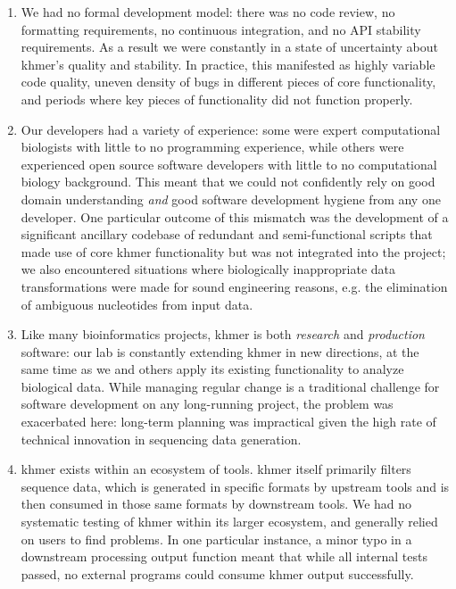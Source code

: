 \documentclass[12pt]{article}
\begin{document}
\begin{enumerate}

\item We had no formal development model: there was no code review, no
  formatting requirements, no continuous integration, and no API
  stability requirements.  As a result we were constantly in a
  state of uncertainty about khmer's quality and stability.  In practice,
  this manifested as highly variable code quality, uneven density of
  bugs in different pieces of core functionality, and periods where
  key pieces of functionality did not function properly.

\item Our developers had a variety of experience: some were expert
  computational biologists with little to no programming experience,
  while others were experienced open source software developers with
  little to no computational biology background.  This meant that we
  could not confidently rely on good domain understanding {\em and}
  good software development hygiene from any one developer.  One
  particular outcome of this mismatch was the development of a
  significant ancillary codebase of redundant and semi-functional
  scripts that made use of core khmer functionality but was not
  integrated into the project; we also encountered situations where
  biologically inappropriate data transformations were made for sound
  engineering reasons, e.g. the elimination of ambiguous nucleotides
  from input data.

\item Like many bioinformatics projects, khmer is both {\em
  research} and {\em production} software: our lab is constantly
  extending khmer in new directions, at the same time as we and others
  apply its existing functionality to analyze biological data.
  While managing regular change is a traditional challenge
  for software development on any long-running project, the problem was
  exacerbated here: long-term planning was impractical given
  the high rate of technical innovation in sequencing data generation.

\item khmer exists within an ecosystem of tools. khmer itself
  primarily filters sequence data, which is generated in specific
  formats by upstream tools and is then consumed in those same formats
  by downstream tools.  We had no systematic testing of khmer within
  its larger ecosystem, and generally relied on users to find
  problems.  In one particular instance, a minor typo in a downstream
  processing output function meant that while all internal tests
  passed, no external programs could consume khmer output
  successfully.

\end{enumerate}
\end{document}
